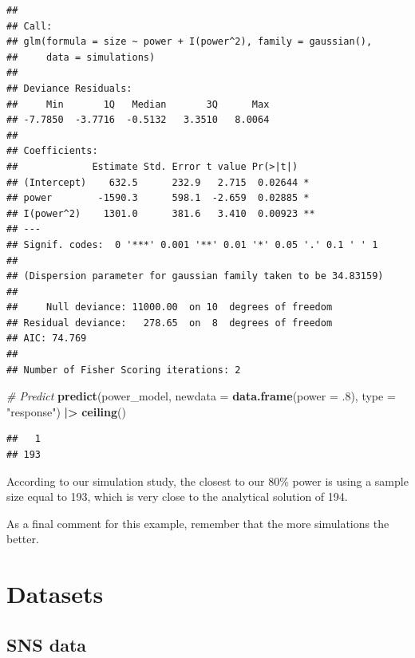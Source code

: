 \documentclass[
]{book}
\newenvironment{Shaded}{\begin{snugshade}}{\end{snugshade}}
\newcommand{\AttributeTok}[1]{\textcolor[rgb]{0.13,0.29,0.53}{#1}}
\newcommand{\CommentTok}[1]{\textcolor[rgb]{0.56,0.35,0.01}{\textit{#1}}}
\newcommand{\DecValTok}[1]{\textcolor[rgb]{0.00,0.00,0.81}{#1}}
\newcommand{\FunctionTok}[1]{\textcolor[rgb]{0.13,0.29,0.53}{\textbf{#1}}}
\newcommand{\NormalTok}[1]{#1}
\newcommand{\SpecialCharTok}[1]{\textcolor[rgb]{0.81,0.36,0.00}{\textbf{#1}}}
\newcommand{\StringTok}[1]{\textcolor[rgb]{0.31,0.60,0.02}{#1}}
\begin{document}
\begin{verbatim}
## 
## Call:
## glm(formula = size ~ power + I(power^2), family = gaussian(), 
##     data = simulations)
## 
## Deviance Residuals: 
##     Min       1Q   Median       3Q      Max  
## -7.7850  -3.7716  -0.5132   3.3510   8.0064  
## 
## Coefficients:
##             Estimate Std. Error t value Pr(>|t|)   
## (Intercept)    632.5      232.9   2.715  0.02644 * 
## power        -1590.3      598.1  -2.659  0.02885 * 
## I(power^2)    1301.0      381.6   3.410  0.00923 **
## ---
## Signif. codes:  0 '***' 0.001 '**' 0.01 '*' 0.05 '.' 0.1 ' ' 1
## 
## (Dispersion parameter for gaussian family taken to be 34.83159)
## 
##     Null deviance: 11000.00  on 10  degrees of freedom
## Residual deviance:   278.65  on  8  degrees of freedom
## AIC: 74.769
## 
## Number of Fisher Scoring iterations: 2
\end{verbatim}

\begin{Shaded}
\begin{Highlighting}[]
\CommentTok{\# Predict}
\FunctionTok{predict}\NormalTok{(power\_model, }\AttributeTok{newdata =} \FunctionTok{data.frame}\NormalTok{(}\AttributeTok{power =}\NormalTok{ .}\DecValTok{8}\NormalTok{), }\AttributeTok{type =} \StringTok{"response"}\NormalTok{) }\SpecialCharTok{|\textgreater{}}
  \FunctionTok{ceiling}\NormalTok{()}
\end{Highlighting}
\end{Shaded}

\begin{verbatim}
##   1 
## 193
\end{verbatim}

According to our simulation study, the closest to our 80\% power is using a sample size equal to 193, which is very close to the analytical solution of 194.

As a final comment for this example, remember that the more simulations the better.

\cleardoublepage

\hypertarget{appendix-appendix}{%
\appendix}


\hypertarget{datasets-1}{%
\chapter{Datasets}\label{datasets-1}}

\hypertarget{sns-data}{%
\section{SNS data}\label{sns-data}}
\end{document}
